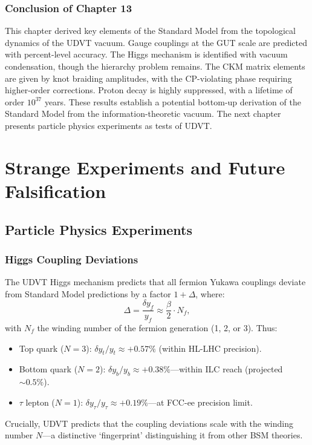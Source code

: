 \documentclass[12pt,a4paper]{book}
\theoremstyle{definition}
\theoremstyle{remark}
\begin{document}
\section{Conclusion of Chapter 13}

This chapter derived key elements of the Standard Model from the topological dynamics of the UDVT vacuum. Gauge couplings at the GUT scale are predicted with percent-level accuracy. The Higgs mechanism is identified with vacuum condensation, though the hierarchy problem remains. The CKM matrix elements are given by knot braiding amplitudes, with the CP-violating phase requiring higher-order corrections. Proton decay is highly suppressed, with a lifetime of order $10^{37}$ years. These results establish a potential bottom-up derivation of the Standard Model from the information-theoretic vacuum. The next chapter presents particle physics experiments as tests of UDVT.

\part{Strange Experiments and Future Falsification}

\chapter{Particle Physics Experiments}
\label{ch:particle_exp}

\section{Higgs Coupling Deviations}

The UDVT Higgs mechanism predicts that all fermion Yukawa couplings deviate from Standard Model predictions by a factor $1 + \Delta$, where:
\begin{equation}
    \Delta = \frac{\delta y_f}{y_f} \approx \frac{\beta}{2} \cdot N_f,
\end{equation}
with $N_f$ the winding number of the fermion generation (1, 2, or 3). Thus:
\begin{itemize}
    \item Top quark ($N = 3$): $\delta y_t/y_t \approx +0.57\%$ (within HL-LHC precision).
    \item Bottom quark ($N = 2$): $\delta y_b/y_b \approx +0.38\%$---within ILC reach (projected $\sim 0.5\%$).
    \item $\tau$ lepton ($N = 1$): $\delta y_\tau/y_\tau \approx +0.19\%$---at FCC-ee precision limit.
\end{itemize}
Crucially, UDVT predicts that the coupling deviations scale with the winding number $N$---a distinctive `fingerprint' distinguishing it from other BSM theories.
\end{document}
